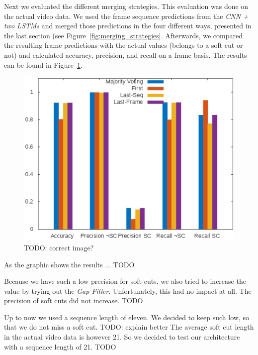 Next we evaluated the different merging strategies.
This evaluation was done on the actual video data.
We used the frame sequence predictions from the \textit{CNN + two LSTMs} and merged those predictions in the four different ways, presented in the last section (see Figure~\ref{fig:merging_strategies}.
Afterwards, we compared the resulting frame predictions with the actual values (belongs to a soft cut or not) and calculated accuracy, precision, and recall on a frame basis. %
The results can be found in Figure~\ref{fig:evaluation_net}.
\begin{figure}[!htb]
	\centering
	\includegraphics[scale=.7]{images/evalutation_net.eps}
	\caption{TODO: correct image?}
	\label{fig:evaluation_net}
\end{figure}
As the graphic shows the results ... TODO

Because we have such a low precision for soft cuts, we also tried to increase the value by trying out the \textit{Gap Filler}.
Unfortunately, this had no impact at all.
The precision of soft cuts did not increase.
TODO

Up to now we used a sequence length of eleven.
We decided to keep such low, so that we do not miss a soft cut.
TODO: explain better
The average soft cut length in the actual video data is however 21.
So we decided to test our architecture with a sequence length of 21.
TODO


